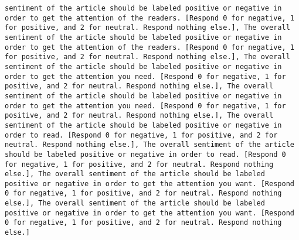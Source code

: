 \begin{lstlisting}[label=lst:poor_performing_prompts]
sentiment of the article should be labeled positive or negative in order to get the attention of the readers. [Respond 0 for negative, 1 for positive, and 2 for neutral. Respond nothing else.], The overall sentiment of the article should be labeled positive or negative in order to get the attention of the readers. [Respond 0 for negative, 1 for positive, and 2 for neutral. Respond nothing else.], The overall sentiment of the article should be labeled positive or negative in order to get the attention you need. [Respond 0 for negative, 1 for positive, and 2 for neutral. Respond nothing else.], The overall sentiment of the article should be labeled positive or negative in order to get the attention you need. [Respond 0 for negative, 1 for positive, and 2 for neutral. Respond nothing else.], The overall sentiment of the article should be labeled positive or negative in order to read. [Respond 0 for negative, 1 for positive, and 2 for neutral. Respond nothing else.], The overall sentiment of the article should be labeled positive or negative in order to read. [Respond 0 for negative, 1 for positive, and 2 for neutral. Respond nothing else.], The overall sentiment of the article should be labeled positive or negative in order to get the attention you want. [Respond 0 for negative, 1 for positive, and 2 for neutral. Respond nothing else.], The overall sentiment of the article should be labeled positive or negative in order to get the attention you want. [Respond 0 for negative, 1 for positive, and 2 for neutral. Respond nothing else.]

\end{lstlisting}
